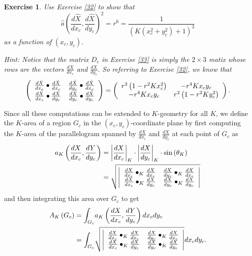 \documentclass{article}%
\newtheorem{exercise}[theorem]{Exercise}
\begin{document}
\begin{exercise}
\label{79}Use Exercise \ref{32} to show that%
\[
\hat{a}\left(  \frac{d\hat{X}}{dx_{c}},\frac{d\hat{X}}{dy_{c}}\right)
^{2}=r^{6}=\frac{1}{\left(  K\left(  x_{c}^{2}+y_{c}^{2}\right)  +1\right)
^{3}}%
\]
as a function of $\left(  x_{c},y_{c}\right)  $.

Hint: Notice that the matrix $D_{c}$ in Exercise \ref{33} is simply the
$2\times3$ matix whose rows are the vectors $\frac{dX}{dx_{c}}$ and $\frac
{dX}{dy_{c}}$. So referring to Exercise \ref{32}, we know that%
\[
\left(
\begin{array}
[c]{cc}%
\frac{d\hat{X}}{dx_{c}}\bullet\frac{d\hat{X}}{dx_{c}} & \frac{d\hat{X}}%
{dy_{c}}\bullet\frac{d\hat{X}}{dx_{c}}\\
\frac{d\hat{X}}{dx_{c}}\bullet\frac{d\hat{X}}{dy_{c}} & \frac{d\hat{X}}%
{dy_{c}}\bullet\frac{d\hat{X}}{dy_{c}}%
\end{array}
\right)  =\left(
\begin{array}
[c]{cc}%
r^{2}\left(  1-r^{2}Kx_{c}^{2}\right)  & -r^{4}Kx_{c}y_{c}\\
-r^{4}Kx_{c}y_{c} & r^{2}\left(  1-r^{2}Ky_{c}^{2}\right)
\end{array}
\right)  .
\]

\end{exercise}

Since all these computations can be extended to $K$-geometry for all $K$, we
define the $K$-area of a region $G_{c}$ in the $\left(  x_{c},y_{c}\right)
$-coordinate plane by first computing the $K$-area of the parallelogram
spanned by $\frac{dX}{dx_{c}}$ and $\frac{dX}{dy_{c}}$ at each point of
$G_{c}$ as%
\begin{align*}
a_{K}\left(  \frac{dX}{dx_{c}},\frac{dY}{dy_{c}}\right)   &  =\left\vert
\frac{dX}{dx_{c}}\right\vert _{K}\cdot\left\vert \frac{dX}{dy_{c}}\right\vert
_{K}\cdot\mathrm{sin}\left(  \theta_{K}\right) \\
&  =\sqrt{\left\vert
\begin{array}
[c]{cc}%
\frac{dX}{dx_{c}}\bullet_{K}\frac{dX}{dx_{c}} & \frac{dX}{dy_{c}}\bullet
_{K}\frac{dX}{dx_{c}}\\
\frac{dX}{dx_{c}}\bullet_{K}\frac{dX}{dy_{c}} & \frac{dX}{dy_{c}}\bullet
_{K}\frac{dX}{dy_{c}}%
\end{array}
\right\vert }%
\end{align*}
and then integrating this area over $G_{c}$ to get%
\begin{align*}
A_{K}\left(  G_{c}\right)   &  =%
{\displaystyle\int\nolimits_{G_{c}}}
a_{K}\left(  \frac{dX}{dx_{c}},\frac{dY}{dy_{c}}\right)  dx_{c}dy_{c}\\
&  =%
{\displaystyle\int\nolimits_{G_{c}}}
\sqrt{\left\vert
\begin{array}
[c]{cc}%
\frac{dX}{dx_{c}}\bullet_{K}\frac{dX}{dx_{c}} & \frac{dX}{dy_{c}}\bullet
_{K}\frac{dX}{dx_{c}}\\
\frac{dX}{dx_{c}}\bullet_{K}\frac{dX}{dy_{c}} & \frac{dX}{dy_{c}}\bullet
_{K}\frac{dX}{dy_{c}}%
\end{array}
\right\vert }dx_{c}dy_{c}.
\end{align*}
\pagebreak
\end{document}
